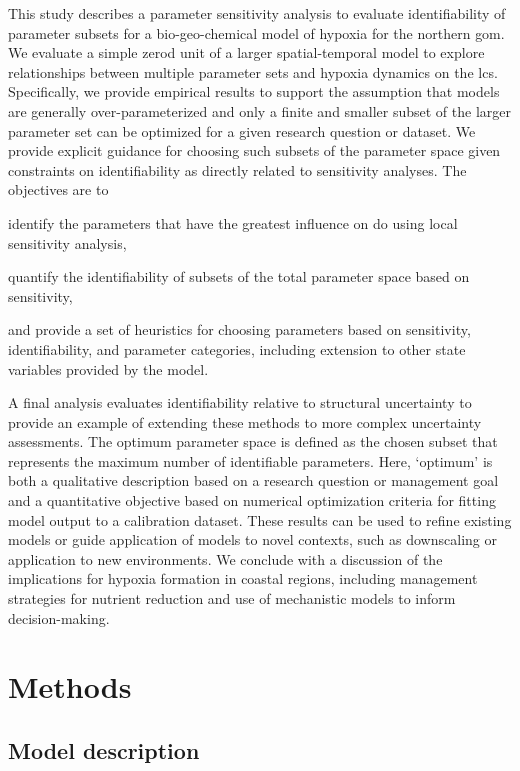 \documentclass[letterpaper,12pt,oneside]{article}\usepackage[]{graphicx}\usepackage[]{color}
\begin{document}
This study describes a parameter sensitivity analysis to evaluate identifiability of parameter subsets for a bio-geo-chemical model of hypoxia for the northern \ac{gom}.  We evaluate a simple \ac{zerod} unit of a larger spatial-temporal model to explore relationships between multiple parameter sets and hypoxia dynamics on the \ac{lcs}.  Specifically, we provide empirical results to support the assumption that models are generally over-parameterized and only a finite and smaller subset of the larger parameter set can be optimized for a given research question or dataset.  We provide explicit guidance for choosing such subsets of the parameter space given constraints on identifiability as directly related to sensitivity analyses.  The objectives are to \begin{inparaenum}[1\upshape)]
\item identify the parameters that have the greatest influence on \ac{do} using local sensitivity analysis,
\item quantify the identifiability of subsets of the total parameter space based on sensitivity,
\item and provide a set of heuristics for choosing parameters based on sensitivity, identifiability, and parameter categories, including extension to other state variables provided by the model.
\end{inparaenum}
A final analysis evaluates identifiability relative to structural uncertainty to provide an example of extending these methods to more complex uncertainty assessments.  The optimum parameter space is defined as the chosen subset that represents the maximum number of identifiable parameters.  Here, `optimum' is both a qualitative description based on a research question or management goal and a quantitative objective based on numerical optimization criteria for fitting model output to a calibration dataset.  These results can be used to refine existing models or guide application of models to novel contexts, such as downscaling or application to new environments.  We conclude with a discussion of the implications for hypoxia formation in coastal regions, including management strategies for nutrient reduction and use of mechanistic models to inform decision-making.

\section{Methods}

\subsection{Model description}
\end{document}
